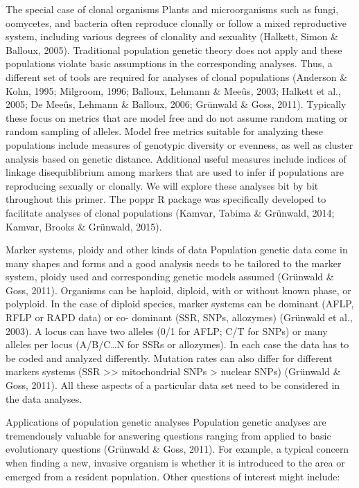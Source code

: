\documentclass[12pt,]{krantz}
\theoremstyle{definition}
\theoremstyle{definition}
\theoremstyle{definition}
\theoremstyle{remark}
\begin{document}
The special case of clonal organisms Plants and microorganisms such as
fungi, oomycetes, and bacteria often reproduce clonally or follow a
mixed reproductive system, including various degrees of clonality and
sexuality (Halkett, Simon \& Balloux, 2005). Traditional population
genetic theory does not apply and these populations violate basic
assumptions in the corresponding analyses. Thus, a different set of
tools are required for analyses of clonal populations (Anderson \& Kohn,
1995; Milgroom, 1996; Balloux, Lehmann \& Meeûs, 2003; Halkett et al.,
2005; De Meeûs, Lehmann \& Balloux, 2006; Grünwald \& Goss, 2011).
Typically these focus on metrics that are model free and do not assume
random mating or random sampling of alleles. Model free metrics suitable
for analyzing these populations include measures of genotypic diversity
or evenness, as well as cluster analysis based on genetic distance.
Additional useful measures include indices of linkage disequiblibrium
among markers that are used to infer if populations are reproducing
sexually or clonally. We will explore these analyses bit by bit
throughout this primer. The poppr R package was specifically developed
to facilitate analyses of clonal populations (Kamvar, Tabima \&
Grünwald, 2014; Kamvar, Brooks \& Grünwald, 2015).

Marker systems, ploidy and other kinds of data Population genetic data
come in many shapes and forms and a good analysis needs to be tailored
to the marker system, ploidy used and corresponding genetic models
assumed (Grünwald \& Goss, 2011). Organisms can be haploid, diploid,
with or without known phase, or polyploid. In the case of diploid
species, marker systems can be dominant (AFLP, RFLP or RAPD data) or co-
dominant (SSR, SNPs, allozymes) (Grünwald et al., 2003). A locus can
have two alleles (0/1 for AFLP; C/T for SNPs) or many alleles per locus
(A/B/C\ldots{}N for SSRs or allozymes). In each case the data has to be
coded and analyzed differently. Mutation rates can also differ for
different markers systems (SSR \textgreater{}\textgreater{}
mitochondrial SNPs \textgreater{} nuclear SNPs) (Grünwald \& Goss,
2011). All these aspects of a particular data set need to be considered
in the data analyses.

Applications of population genetic analyses Population genetic analyses
are tremendously valuable for answering questions ranging from applied
to basic evolutionary questions (Grünwald \& Goss, 2011). For example, a
typical concern when finding a new, invasive organism is whether it is
introduced to the area or emerged from a resident population. Other
questions of interest might include:
\end{document}
